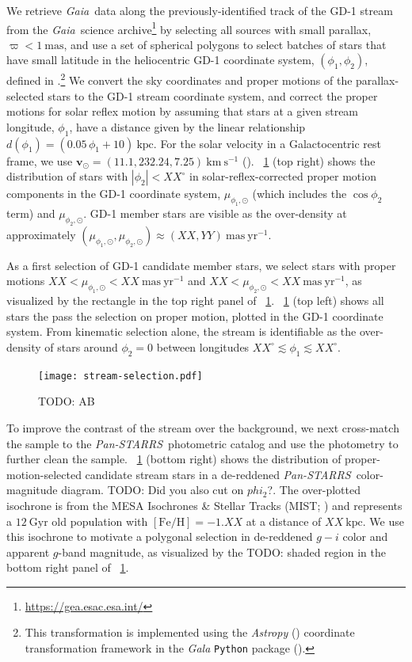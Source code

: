 \documentclass[modern]{aastex62}
\newcommand{\package}[1]{\textsl{#1}}
\newcommand{\gaia}{\textsl{Gaia}}
\newcommand{\pans}{\textsl{Pan-STARRS}}
\newcommand{\kpc}{\textrm{kpc}}
\newcommand{\kms}{\ensuremath{\textrm{km}~\textrm{s}^{-1}}}
\newcommand{\bs}[1]{\boldsymbol{#1}}
\newcommand{\masyr}{\ensuremath{\textrm{mas}~\textrm{yr}^{-1}}}
\newcommand{\feh}{\ensuremath{[\textrm{Fe} / \textrm{H}]}}
\newcommand{\todo}[1]{{\color{red} TODO: #1}}
\begin{document}
We retrieve \gaia\ data along the previously-identified track of the GD-1 stream
from the \gaia\ science archive\footnote{\url{https://gea.esac.esa.int/}} by
selecting all sources with small parallax, $\varpi < 1~\textrm{mas}$, and use a
set of spherical polygons to select batches of stars that have small latitude in
the heliocentric GD-1 coordinate system, $(\phi_1, \phi_2)$, defined in
\cite{Koposov:2010}.\footnote{This transformation is implemented using the
\package{Astropy} (\citealt{astropy}) coordinate transformation framework in the
\package{Gala} \texttt{Python} package (\citealt{gala}).}
We convert the sky coordinates and proper motions of the parallax-selected stars
to the GD-1 stream coordinate system, and correct the proper motions for solar
reflex motion by assuming that stars at a given stream longitude, $\phi_1$, have
a distance given by the linear relationship $d(\phi_1) = (0.05 \, \phi_1 +
10)~\textrm{kpc}$.
For the solar velocity in a Galactocentric rest frame, we use $\bs{v}_\odot =
(11.1, 232.24, 7.25)~\kms$ (\citealt{Schonrich:2010, Bovy:2015}).
\figurename~\ref{fig:selection} (top right) shows the distribution of stars with
$|\phi_2| < XX^\circ$ in solar-reflex-corrected proper motion components in the
GD-1 coordinate system, $\mu_{\phi_1, \odot}$ (which includes the $\cos{\phi_2}$
term) and $\mu_{\phi_2, \odot}$.
GD-1 member stars are visible as the over-density at approximately
$(\mu_{\phi_1, \odot}, \mu_{\phi_2, \odot}) \approx (XX, YY)~\masyr$.

As a first selection of GD-1 candidate member stars, we select stars with proper
motions $XX < \mu_{\phi_1, \odot} < XX~\masyr$ and $XX < \mu_{\phi_2, \odot} <
XX~\masyr$, as visualized by the rectangle in the top right panel of
\figurename~\ref{fig:selection}.
\figurename~\ref{fig:selection} (top left) shows all stars the pass the
selection on proper motion, plotted in the GD-1 coordinate system.
From kinematic selection alone, the stream is identifiable as the over-density
of stars around $\phi_2 = 0$ between longitudes $XX^\circ \lesssim \phi_1
\lesssim XX^\circ$.

\begin{figure}[h]
\begin{center}
\texttt{[image: stream-selection.pdf]}
\end{center}
\caption{
    \todo{AB}
\label{fig:selection}
}
\end{figure}

To improve the contrast of the stream over the background, we next cross-match
the sample to the \pans\ photometric catalog and use the photometry to further
clean the sample.
\figurename~\ref{fig:selection} (bottom right) shows the distribution of
proper-motion-selected candidate stream stars in a de-reddened \pans\
color-magnitude diagram.
\todo{Did you also cut on $phi_2$?}.
The over-plotted isochrone is from the MESA Isochrones \& Stellar Tracks (MIST;
\citealt{Dotter:2016, Choi:2016, Paxton:2011}) and represents a
$12~\textrm{Gyr}$ old population with $\feh = -1.XX$ at a distance of $XX~\kpc$.
We use this isochrone to motivate a polygonal selection in de-reddened $g-i$
color and apparent $g$-band magnitude, as visualized by the \todo{shaded} region
in the bottom right panel of \figurename~\ref{fig:selection}.
\end{document}
